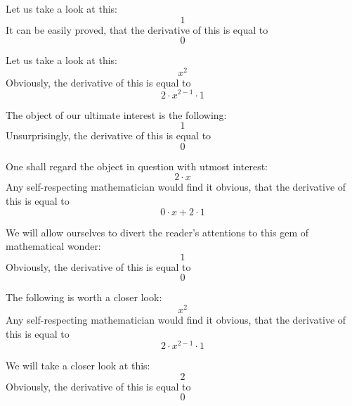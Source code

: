 \documentclass{article}
\begin{document}
Let us take a look at this:
\begin{equation}
1 
\end{equation}
It can be easily proved, that the derivative of this is equal to
\begin{equation}
0 
\end{equation}

Let us take a look at this:
\begin{equation}
x ^{2 } 
\end{equation}
Obviously, the derivative of this is equal to
\begin{equation}
2 \cdot x ^{2 - 1 } \cdot 1 
\end{equation}

The object of our ultimate interest is the following:
\begin{equation}
1 
\end{equation}
Unsurprisingly, the derivative of this is equal to
\begin{equation}
0 
\end{equation}

One shall regard the object in question with utmost interest:
\begin{equation}
2 \cdot x 
\end{equation}
Any self-respecting mathematician would find it obvious, that the derivative of this is equal to
\begin{equation}
0 \cdot x + 2 \cdot 1 
\end{equation}

We will allow ourselves to divert the reader's attentions to this gem of mathematical wonder:
\begin{equation}
1 
\end{equation}
Obviously, the derivative of this is equal to
\begin{equation}
0 
\end{equation}

The following is worth a closer look:
\begin{equation}
x ^{2 } 
\end{equation}
Any self-respecting mathematician would find it obvious, that the derivative of this is equal to
\begin{equation}
2 \cdot x ^{2 - 1 } \cdot 1 
\end{equation}

We will take a closer look at this:
\begin{equation}
2 
\end{equation}
Obviously, the derivative of this is equal to
\begin{equation}
0 
\end{equation}
\end{document}
